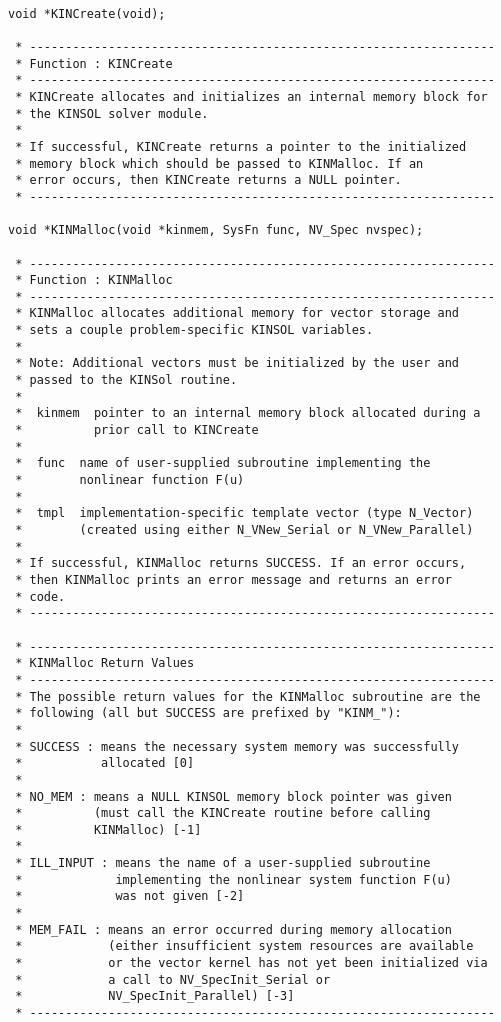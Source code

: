 \documentclass[11pt]{article}
\begin{document}
\small
\begin{verbatim}

void *KINCreate(void);

 * -----------------------------------------------------------------
 * Function : KINCreate
 * -----------------------------------------------------------------
 * KINCreate allocates and initializes an internal memory block for
 * the KINSOL solver module.
 *
 * If successful, KINCreate returns a pointer to the initialized
 * memory block which should be passed to KINMalloc. If an
 * error occurs, then KINCreate returns a NULL pointer.
 * -----------------------------------------------------------------

void *KINMalloc(void *kinmem, SysFn func, NV_Spec nvspec);

 * -----------------------------------------------------------------
 * Function : KINMalloc
 * -----------------------------------------------------------------
 * KINMalloc allocates additional memory for vector storage and
 * sets a couple problem-specific KINSOL variables.
 *
 * Note: Additional vectors must be initialized by the user and
 * passed to the KINSol routine.
 *
 *  kinmem  pointer to an internal memory block allocated during a
 *          prior call to KINCreate
 *
 *  func  name of user-supplied subroutine implementing the
 *        nonlinear function F(u)
 *
 *  tmpl  implementation-specific template vector (type N_Vector)
 *        (created using either N_VNew_Serial or N_VNew_Parallel)
 *
 * If successful, KINMalloc returns SUCCESS. If an error occurs,
 * then KINMalloc prints an error message and returns an error
 * code.
 * -----------------------------------------------------------------

 * -----------------------------------------------------------------
 * KINMalloc Return Values
 * -----------------------------------------------------------------
 * The possible return values for the KINMalloc subroutine are the
 * following (all but SUCCESS are prefixed by "KINM_"):
 *
 * SUCCESS : means the necessary system memory was successfully
 *           allocated [0]
 *
 * NO_MEM : means a NULL KINSOL memory block pointer was given
 *          (must call the KINCreate routine before calling
 *          KINMalloc) [-1]
 *
 * ILL_INPUT : means the name of a user-supplied subroutine
 *             implementing the nonlinear system function F(u)
 *             was not given [-2]
 *
 * MEM_FAIL : means an error occurred during memory allocation
 *            (either insufficient system resources are available
 *            or the vector kernel has not yet been initialized via
 *            a call to NV_SpecInit_Serial or
 *            NV_SpecInit_Parallel) [-3]
 * -----------------------------------------------------------------

\end{verbatim}
\normalsize
\end{document}
